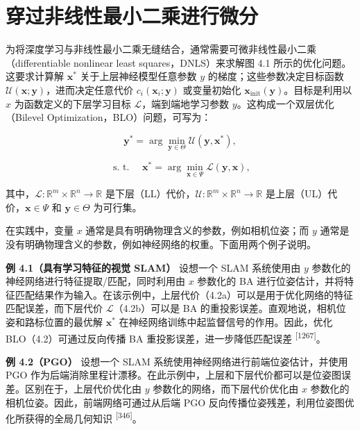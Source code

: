 \section{穿过非线性最小二乘进行微分}

为将深度学习与非线性最小二乘无缝结合，通常需要可微非线性最小二乘（differentiable nonlinear least squares，DNLS）来求解图 4.1 所示的优化问题。这要求计算解 $\pmb { x } ^ { * }$ 关于上层神经模型任意参数 $y$ 的梯度；这些参数决定目标函数 $\mathcal { U } ( \pmb { x } ; \pmb { y } )$，进而决定任意代价 $c _ { i } ( { \pmb x } _ { i } ; { \pmb y } )$ 或变量初始化 ${ \pmb x } _ { \mathrm { i n i t } } ( { \pmb y } )$。目标是利用以 $x$ 为函数定义的下层学习目标 $\mathcal { L }$，端到端地学习参数 $y$。这构成一个双层优化（Bilevel Optimization，BLO）问题，可写为：

\begin{equation}
\boldsymbol {y} ^ {*} = \arg \min _ {\boldsymbol {y} \in \Theta} \mathcal {U} (\boldsymbol {y}, \boldsymbol {x} ^ {*}),\tag{4.2a}
\end{equation}

\begin{equation}
\text { s.   t. } \quad \boldsymbol {x} ^ {*} = \arg \min _ {\boldsymbol {x} \in \Psi} \mathcal {L} (\boldsymbol {y}, \boldsymbol {x}),\tag{4.2b}
\end{equation}

其中，$\mathcal{L}: \mathbb{R}^{m} \times \mathbb{R}^{n} \to \mathbb{R}$ 是下层（LL）代价，$\mathcal{U}: \mathbb{R}^{m} \times \mathbb{R}^{n} \to \mathbb{R}$ 是上层（UL）代价，$\pmb{x} \in \Psi$ 和 $\pmb{y} \in \Theta$ 为可行集。

在实践中，变量 $x$ 通常是具有明确物理含义的参数，例如相机位姿；而 $y$ 通常是没有明确物理含义的参数，例如神经网络的权重。下面用两个例子说明。

\textbf{例 4.1（具有学习特征的视觉 SLAM）} 设想一个 SLAM 系统使用由 $y$ 参数化的神经网络进行特征提取/匹配，同时利用由 $x$ 参数化的 BA 进行位姿估计，并将特征匹配结果作为输入。在该示例中，上层代价（4.2a）可以是用于优化网络的特征匹配误差，而下层代价 $\mathcal{L}$（4.2b）可以是 BA 的重投影误差。直观地说，相机位姿和路标位置的最优解 $\pmb{x}^{*}$ 在神经网络训练中起监督信号的作用。因此，优化 BLO（4.2）可通过反向传播 BA 重投影误差，进一步降低匹配误差 \textsuperscript{[1267]}。

\textbf{例 4.2（PGO）} 设想一个 SLAM 系统使用神经网络进行前端位姿估计，并使用 PGO 作为后端消除里程计漂移。在此示例中，上层和下层代价都可以是位姿图误差。区别在于，上层代价优化由 $y$ 参数化的网络，而下层代价优化由 $x$ 参数化的相机位姿。因此，前端网络可通过从后端 PGO 反向传播位姿残差，利用位姿图优化所获得的全局几何知识 \textsuperscript{[346]}。

